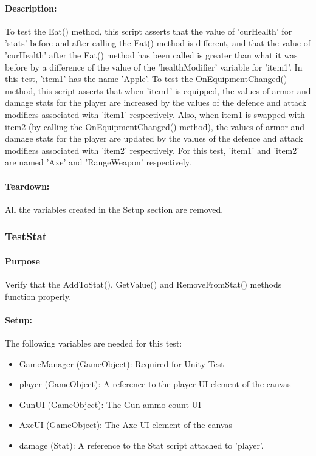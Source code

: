 \documentclass[12pt, titlepage]{article}
\begin{document}
\paragraph{Description: }
To test the Eat() method, this script asserts that the value of 'curHealth' for 'stats' before and after calling the Eat() method is different, and that the value of 'curHealth' after the Eat() method has been called is greater than what it was before by a difference of the value of the 'healthModifier' variable for 'item1'. In this test, 'item1' has the name 'Apple'.
\newline
To test the OnEquipmentChanged() method, this script asserts that when 'item1' is equipped, the values of armor and damage stats for the player are increased by the values of the defence and attack modifiers associated with 'item1' respectively. Also, when item1 is swapped with item2 (by calling the OnEquipmentChanged() method),  the values of armor and damage stats for the player are updated by the values of the defence and attack modifiers associated with 'item2' respectively.
For this test, 'item1' and 'item2' are named 'Axe' and 'RangeWeapon' respectively.
\paragraph{Teardown: } All the variables created in the Setup section are removed.
\subsubsection{Test\textunderscore Stat}

\paragraph{Purpose} Verify that the AddToStat(), GetValue() and RemoveFromStat() methods function properly.

\paragraph{Setup: } The following variables are needed for this test:
\begin{itemize}
	\item GameManager (GameObject): Required for Unity Test
	\item  player (GameObject): A reference to the player UI element of the canvas
	\item  GunUI (GameObject): The Gun ammo count UI
	\item AxeUI (GameObject): The Axe UI element of the canvas
	\item damage (Stat): A reference to the Stat script attached to 'player'.

	
\end{itemize}
\end{document}
